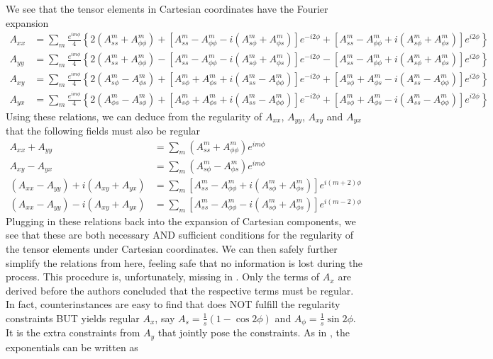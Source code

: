 \documentclass[a4paper, 11pt]{article}
\begin{document}
We see that the tensor elements in Cartesian coordinates have the Fourier expansion
\[\begin{aligned}
    A_{xx} &= \sum_m \frac{e^{im\phi}}{4} \left\{2\left(A_{ss}^m + A_{\phi\phi}^m\right) + \left[A_{ss}^m - A_{\phi\phi}^m - i \left(A_{s\phi}^m + A_{\phi s}^m\right)\right] e^{-i2\phi} + \left[A_{ss}^m - A_{\phi\phi}^m + i \left(A_{s\phi}^m + A_{\phi s}^m\right)\right] e^{i2\phi} \right\} \\ 
    A_{yy} &= \sum_m \frac{e^{im\phi}}{4} \left\{2\left(A_{ss}^m + A_{\phi\phi}^m\right) - \left[A_{ss}^m - A_{\phi\phi}^m - i \left(A_{s\phi}^m + A_{\phi s}^m\right)\right] e^{-i2\phi} - \left[A_{ss}^m - A_{\phi\phi}^m + i \left(A_{s\phi}^m + A_{\phi s}^m\right)\right] e^{i2\phi} \right\} \\ 
    A_{xy} &= \sum_m \frac{e^{im\phi}}{4} \left\{2 \left(A_{s\phi}^m - A_{\phi s}^m\right) + \left[A_{s\phi}^m + A_{\phi s}^m + i \left(A_{ss}^m - A_{\phi\phi}^m\right)\right]e^{-i2\phi} + \left[A_{s\phi}^m + A_{\phi s}^m - i \left(A_{ss}^m - A_{\phi\phi}^m\right)\right]e^{i2\phi}\right\} \\
    A_{yx} &= \sum_m \frac{e^{im\phi}}{4} \left\{2 \left(A_{\phi s}^m - A_{s\phi}^m\right) + \left[A_{s\phi}^m + A_{\phi s}^m + i \left(A_{ss}^m - A_{\phi\phi}^m\right)\right]e^{-i2\phi} + \left[A_{s\phi}^m + A_{\phi s}^m - i \left(A_{ss}^m - A_{\phi\phi}^m\right)\right]e^{i2\phi}\right\}
\end{aligned}\]
Using these relations, we can deduce from the regularity of $A_{xx}$, $A_{yy}$, $A_{xy}$ and $A_{yx}$ that the following fields must also be regular
\[
\begin{aligned}
    A_{xx} + A_{yy} &= \sum_m \left(A_{ss}^m + A_{\phi\phi}^m\right) e^{im\phi} \\ 
    A_{xy} - A_{yx} &= \sum_m \left(A_{s\phi}^m - A_{\phi s}^m\right) e^{im\phi} \\ 
    \left(A_{xx} - A_{yy}\right) + i \left(A_{xy} + A_{yx}\right) &= \sum_m \left[A_{ss}^m - A_{\phi\phi}^m + i \left(A_{s\phi}^m + A_{\phi s}^m\right)\right] e^{i(m+2)\phi} \\
    \left(A_{xx} - A_{yy}\right) - i \left(A_{xy} + A_{yx}\right) &= \sum_m \left[A_{ss}^m - A_{\phi\phi}^m - i \left(A_{s\phi}^m + A_{\phi s}^m\right)\right] e^{i(m-2)\phi}
\end{aligned}
\]
Plugging in these relations back into the expansion of Cartesian components, we see that these are both necessary AND sufficient conditions for the regularity of the tensor elements under Cartesian coordinates. We can then safely further simplify the relations from here, feeling safe that no information is lost during the process. This procedure is, unfortunately, missing in \textcite{lewis_physical_1990}. Only the terms of $A_x$ are derived before the authors concluded that the respective terms must be regular. In fact, counterinstances are easy to find that does NOT fulfill the regularity constraints BUT yields regular $A_x$, say $A_s = \frac{1}{s} \left(1 - \cos 2\phi\right)$ and $A_\phi = \frac{1}{s} \sin 2\phi$. It is the extra constraints from $A_y$ that jointly pose the constraints. As in \textcite{lewis_physical_1990}, the exponentials can be written as
\end{document}
